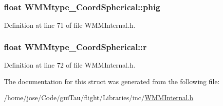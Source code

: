 \hypertarget{struct_w_m_mtype___coord_spherical_a94d857d131a4281543b46b4f3dc2a28e}{
\subsubsection[{phig}]{\setlength{\rightskip}{0pt plus 5cm}float W\-M\-Mtype\-\_\-\-Coord\-Spherical\-::phig}}\label{struct_w_m_mtype___coord_spherical_a94d857d131a4281543b46b4f3dc2a28e}


Definition at line 71 of file W\-M\-M\-Internal.\-h.

\hypertarget{struct_w_m_mtype___coord_spherical_ad7a66b81a59d40782c0618c94256073f}{
\subsubsection[{r}]{\setlength{\rightskip}{0pt plus 5cm}float W\-M\-Mtype\-\_\-\-Coord\-Spherical\-::r}}\label{struct_w_m_mtype___coord_spherical_ad7a66b81a59d40782c0618c94256073f}


Definition at line 72 of file W\-M\-M\-Internal.\-h.



The documentation for this struct was generated from the following file\-:\begin{DoxyCompactItemize}
\item 
/home/jose/\-Code/gui\-Tau/flight/\-Libraries/inc/\hyperlink{_w_m_m_internal_8h}{W\-M\-M\-Internal.\-h}\end{DoxyCompactItemize}
